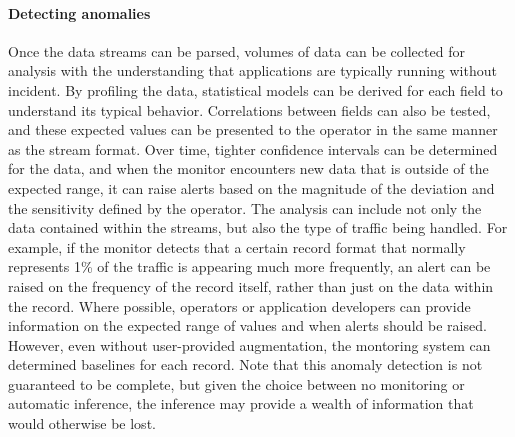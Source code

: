 \paragraph*{Detecting anomalies} Once the data streams can be parsed,
volumes of data can be collected for analysis with the understanding
that applications are typically running without incident. By profiling
the data, statistical models can be derived for each field to
understand its typical behavior. Correlations between fields can also
be tested, and these expected values can be presented to the operator
in the same manner as the stream format. Over time,
tighter confidence intervals can be determined for the data, and when
the monitor encounters new data that is outside of the expected range,
it can raise alerts based on the magnitude of the deviation and the
sensitivity defined by the operator. The analysis can include not only 
the data contained within the streams, but also the type of traffic
being handled. For example, if the monitor detects that a certain
record format that normally represents 1\% of the traffic is appearing
much more frequently, an alert can be raised on the frequency of the
record itself, rather than just on the data within the record. Where
possible, operators or application developers can provide
information on the expected range of values and when alerts should be
raised.  However, even without user-provided augmentation, the
montoring system can determined baselines for each
record. Note that this anomaly 
detection is not guaranteed to be complete, but given the choice
between no monitoring or automatic inference, the inference may
provide a wealth of information that would otherwise be lost.

